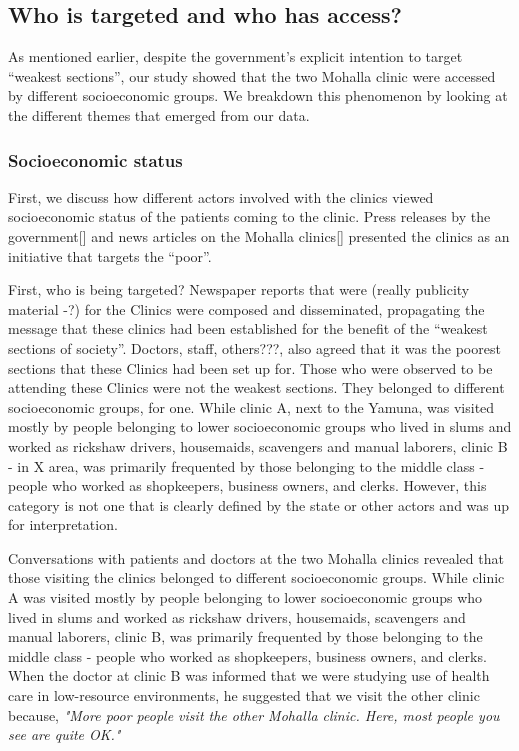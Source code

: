 \subsection{Who is targeted and who has access?}
As mentioned earlier, despite the government's explicit intention to target ``weakest sections'', our study showed that the two Mohalla clinic were accessed by different socioeconomic groups. We breakdown this phenomenon by looking at the  different themes that emerged from our data.

\subsubsection*{Socioeconomic status}
First, we discuss how different actors involved with the clinics viewed socioeconomic status of the patients coming to the clinic. Press releases by the government[] and news articles on the Mohalla clinics[] presented the clinics as an initiative that targets the ``poor''. 

First, who is being targeted? Newspaper reports that were (really publicity material -?)%
for the Clinics were composed and disseminated, propagating the message that these clinics had been established for the benefit of the ``weakest sections of society''. Doctors, staff, others???, also agreed that it was the poorest sections that these Clinics had been set up for. Those who were observed to be attending these Clinics were not the weakest sections. They belonged to different socioeconomic groups, for one. While clinic A, next to the Yamuna, was visited mostly by people belonging to lower socioeconomic groups who lived in slums and worked as rickshaw drivers, housemaids, scavengers and manual laborers, clinic B - in X area, was primarily frequented by those belonging to the middle class - people who worked as shopkeepers, business owners, and clerks. However, this category is not one that is clearly defined by the state or other actors and was up for interpretation.

Conversations with patients and doctors at the two Mohalla clinics revealed that those visiting the clinics belonged to different socioeconomic groups. While clinic A was visited mostly by people belonging to lower socioeconomic groups who lived in slums and worked as rickshaw drivers, housemaids, scavengers and manual laborers, clinic B, was primarily frequented by those belonging to the middle class - people who worked as shopkeepers, business owners, and clerks. When the doctor at clinic B was informed that we were studying use of health care in low-resource environments, he suggested that we visit the other clinic because,
\textit{"More poor people visit the other Mohalla clinic. Here, most people 
you see are quite OK."}

